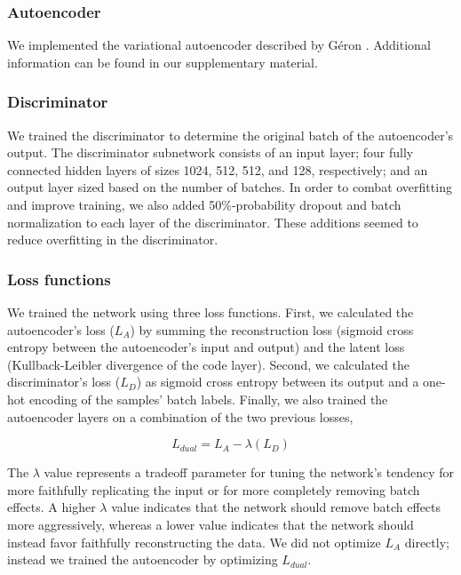 \documentclass[notitlepage]{article}
\begin{document}
\subsubsection{Autoencoder}

We implemented the variational autoencoder \cite{louizos_variational_2015} described by Géron \cite{geron_hands-machine_2017}.
Additional information can be found in our supplementary material.

\subsubsection{Discriminator}

We trained the discriminator to determine the original batch of the autoencoder's output.
The discriminator subnetwork consists of an input layer; four fully connected hidden layers of sizes 1024, 512, 512, and 128, respectively; and an output layer sized based on the number of batches.
In order to combat overfitting and improve training, we also added 50\%-probability dropout \cite{srivastava_dropout_2014} and batch normalization \cite{ioffe_batch_2015} to each layer of the discriminator.
These additions seemed to reduce overfitting in the discriminator.

\subsubsection{Loss functions}

We trained the network using three loss functions.
First, we calculated the autoencoder's loss ($L_A$) by summing the reconstruction loss (sigmoid cross entropy between the autoencoder's input and output) and the latent loss (Kullback-Leibler divergence \cite{kullback_information_1951} of the code layer).
Second, we calculated the discriminator's loss ($L_D$) as sigmoid cross entropy between its output and a one-hot encoding of the samples' batch labels.
Finally, we also trained the autoencoder layers on a combination of the two previous losses,

\begin{equation}
	\label{dual_loss}
	L_{dual} = L_A - \lambda{}(L_D)
\end{equation}

The $\lambda$ value represents a tradeoff parameter for tuning the network's tendency for more faithfully replicating the input or for more completely removing batch effects.
A higher $\lambda$ value indicates that the network should remove batch effects more aggressively, whereas a lower value indicates that the network should instead favor faithfully reconstructing the data.
We did not optimize $L_A$ directly; instead we trained the autoencoder by optimizing $L_{dual}$.
\end{document}
